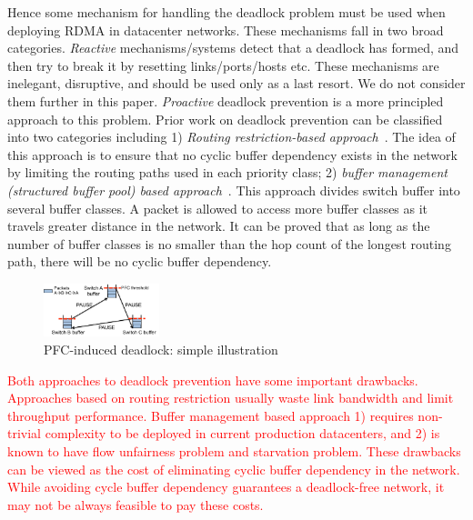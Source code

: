 Hence some mechanism for handling the deadlock problem must be used when
deploying RDMA in datacenter networks.  These mechanisms fall in two broad
categories. {\em Reactive} mechanisms/systems detect that a deadlock has formed,
and then try to break it by resetting links/ports/hosts etc.  These mechanisms
are inelegant, disruptive, and should be used only as a last resort.  We do not
consider them further in this paper.  {\em Proactive} deadlock prevention is a
more principled approach to this problem.  Prior work on deadlock prevention can
be classified into two categories including 1) \textit{Routing restriction-based
approach}~\cite{tcpbolt,flich2012survey}. The idea of this approach is to ensure
that no cyclic buffer dependency exists in the network by limiting the routing
paths used in each priority class;  2) \textit{buffer management (structured
buffer pool) based approach}~\cite{gerla1980flow,karol2003prevention}. This
approach divides switch buffer into several buffer classes. A packet is allowed
to access more buffer classes as it travels greater distance in the network. It
can be proved that as long as the number of buffer classes is no smaller than
the hop count of the longest routing path, there will be no cyclic buffer
dependency.

\begin{figure}
\centering
\includegraphics[width=0.3\textwidth] {figs/deadlock}
\vspace{-0.15in}
\caption{PFC-induced deadlock: simple illustration}
\vspace{-0.25in}
\label{fig:deadlock_example}
\end{figure}


\textcolor{red}{Both approaches to deadlock prevention have some important drawbacks.
Approaches based on routing restriction usually waste link bandwidth and limit
throughput performance. Buffer management based approach 1) requires
non-trivial complexity to be deployed in current production datacenters, and 2) is known to have flow unfairness problem and starvation problem. 
These drawbacks can be viewed as the cost of eliminating cyclic buffer dependency in the network. While avoiding cycle buffer
dependency guarantees a deadlock-free network, it may not be always feasible to
pay these costs.}

